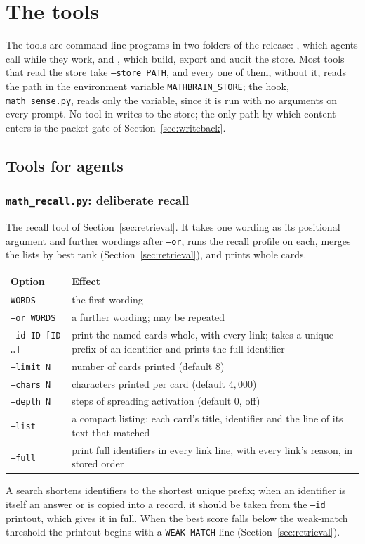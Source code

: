 \section{The tools}\label{app:tools}

The tools are command-line programs in two folders of the release: , which agents call while they work, and , which build, export and audit the store. Most tools that read the store take \texttt{--store PATH}, and every one of them, without it, reads the path in the environment variable \texttt{MATHBRAIN\_STORE}; the hook, \texttt{math\_sense.py}, reads only the variable, since it is run with no arguments on every prompt. No tool in  writes to the store; the only path by which content enters is the packet gate of Section~\ref{sec:writeback}.

\subsection{Tools for agents}

\subsubsection*{\texttt{math\_recall.py}: deliberate recall}
The recall tool of Section~\ref{sec:retrieval}. It takes one wording as its positional argument and further wordings after \texttt{--or}, runs the recall profile on each, merges the lists by best rank (Section~\ref{sec:retrieval}), and prints whole cards.
\begin{center}\small
\begin{tabular}{p{3.6cm}p{10.4cm}}
\toprule
Option & Effect\\
\midrule
\texttt{WORDS} & the first wording\\
\texttt{--or WORDS} & a further wording; may be repeated\\
\texttt{--id ID [ID \dots]} & print the named cards whole, with every link; takes a unique prefix of an identifier and prints the full identifier\\
\texttt{--limit N} & number of cards printed (default $8$)\\
\texttt{--chars N} & characters printed per card (default $4{,}000$)\\
\texttt{--depth N} & steps of spreading activation (default $0$, off)\\
\texttt{--list} & a compact listing: each card's title, identifier and the line of its text that matched\\
\texttt{--full} & print full identifiers in every link line, with every link's reason, in stored order\\
\bottomrule
\end{tabular}
\end{center}
A search shortens identifiers to the shortest unique prefix; when an identifier is itself an answer or is copied into a record, it should be taken from the \texttt{--id} printout, which gives it in full. When the best score falls below the weak-match threshold the printout begins with a \texttt{WEAK MATCH} line (Section~\ref{sec:retrieval}).

